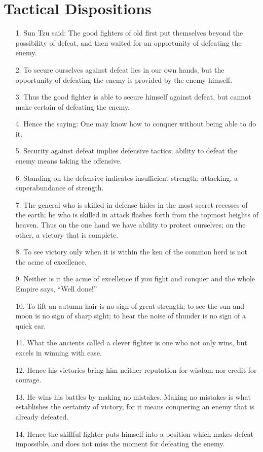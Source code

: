 \documentclass[11pt,openany]{memoir}
\newcommand{\enumeratemargin}{1.30em}
\begin{document}
\chapter{Tactical Dispositions}
\begin{enumerate}[leftmargin=\enumeratemargin]
\item[1.] Sun Tzu said: The good fighters of old first put themselves beyond the possibility of defeat, and then waited for an opportunity of defeating the enemy.
\item[2.] To secure ourselves against defeat lies in our own hands, but the opportunity of defeating the enemy is provided by the enemy himself.
\item[3.] Thus the good fighter is able to secure himself against defeat, but cannot make certain of defeating the enemy.
\item[4.] Hence the saying: One may know how to conquer without being able to do it.
\item[5.] Security against defeat implies defensive tactics; ability to defeat the enemy means taking the offensive.
\item[6.] Standing on the defensive indicates insufficient strength; attacking, a superabundance of strength.
\item[7.] The general who is skilled in defense hides in the most secret recesses of the earth; he who is skilled in attack flashes forth from the topmost heights of heaven. Thus on the one hand we have ability to protect ourselves; on the other, a victory that is complete.
\item[8.] To see victory only when it is within the ken of the common herd is not the acme of excellence.
\item[9.] Neither is it the acme of excellence if you fight and conquer and the whole Empire says, ``Well done!''
\item[10.] To lift an autumn hair is no sign of great strength; to see the sun and moon is no sign of sharp sight; to hear the noise of thunder is no sign of a quick ear.
\item[11.] What the ancients called a clever fighter is one who not only wins, but excels in winning with ease.
\item[12.] Hence his victories bring him neither reputation for wisdom nor credit for courage.
\item[13.] He wins his battles by making no mistakes. Making no mistakes is what establishes the certainty of victory, for it means conquering an enemy that is already defeated.
\item[14.] Hence the skillful fighter puts himself into a position which makes defeat impossible, and does not miss the moment for defeating the enemy.

\end{enumerate}
\end{document}
